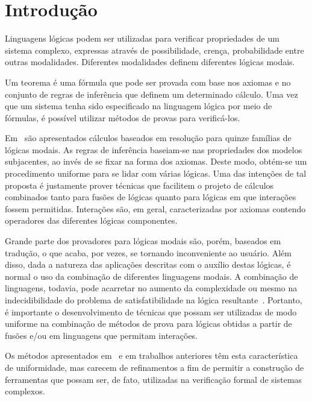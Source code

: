 \chapter{Introdução}

Linguagens lógicas podem ser utilizadas para verificar propriedades de um
sistema complexo, expressas através de possibilidade, crença, probabilidade
entre outras modalidades. Diferentes modalidades definem diferentes lógicas
modais.

Um teorema é uma fórmula que pode ser provada com base nos axiomas e no conjunto
de regras de inferência que definem um determinado cálculo. Uma vez que um
sistema tenha sido especificado na linguagem lógica por meio de fórmulas, é
possível utilizar métodos de provas para verificá-los.

Em~\cite{nalon} são apresentados cálculos baseados em resolução para quinze
famílias de lógicas modais. As regras de inferência baseiam-se nas propriedades
dos modelos subjacentes, ao invés de se fixar na forma dos axiomas. Deste modo,
obtém-se um procedimento uniforme para se lidar com várias lógicas. Uma das
intenções de tal proposta é justamente prover técnicas que facilitem o projeto
de cálculos combinados tanto para fusões de lógicas quanto para lógicas em que
interações fossem permitidas. Interações são, em geral, caracterizadas por
axiomas contendo operadores das diferentes lógicas componentes.

Grande parte dos provadores para lógicas modais são, porém, baseados em
tradução, o que acaba, por vezes, se tornando inconveniente ao usuário. Além
disso, dada a natureza das aplicações descritas com o auxílio destas lógicas, é
normal o uso da combinação de diferentes linguagens modais. A combinação de
linguagens, todavia, pode acarretar no aumento da complexidade ou mesmo na
indecidibilidade do problema de satisfatibilidade na lógica
resultante~\cite{mdml}. %
Portanto, é importante o desenvolvimento de técnicas que possam ser utilizadas
de modo uniforme na combinação de métodos de prova para lógicas obtidas a partir
de fusões e/ou em linguagens que permitam interações.

Os métodos apresentados em~\cite{nalon} e em trabalhos anteriores têm esta
característica de uniformidade, mas carecem de refinamentos a fim de permitir a
construção de ferramentas que possam ser, de fato, utilizadas na verificação
formal de sistemas complexos.

